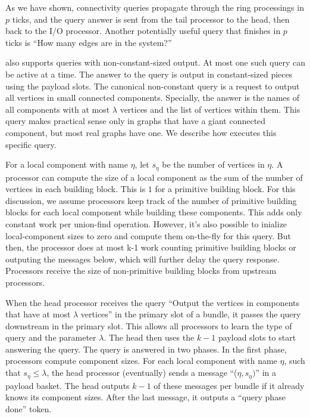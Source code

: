 As we have shown, connectivity queries propagate through the \XStream ring
processings in $p$ \XStream ticks, and the query answer is sent from the
tail processor to the head, then back to the I/O processor. Another potentially
useful query that finishes in $p$ \XStream ticks is ``How many edges are in the system?''
 

\XStream also supports queries with non-constant-sized output. At most
one such query can be active at a time. The answer to the query is
output in constant-sized pieces using the payload slots. The canonical
non-constant query is a request to output all vertices in small
connected components. Specially, the answer is the names of all
components with at most $\lambda$ vertices and the list of vertices
within them.  This query makes practical sense only in graphs that
have a giant connected component, but most real graphs have one. We
describe how \XStream executes this specific query.

For a local component with name $\eta$, let $s_{\eta}$ be the number
of vertices in $\eta$.  A processor can compute the size of a local
component as the sum of the number of vertices in each building block.
This is $1$ for a primitive building block.  For this discussion, we
assume processors keep track of the number of primitive building
blocks for each local component while building these components. This
adds only constant work per union-find operation.  However, it's also
possible to inialize local-component sizes to zero and compute them
on-the-fly for this query.  But then, the processor does at most k-1
work counting primitive building blocks or outputing the messages
below, which will further delay the query response. Processors receive
the size of non-primitive building blocks from upstream processors.

When the head processor receives the query ``Output the vertices in
components that have at most $\lambda$ vertices'' in the primary slot
of a bundle, it passes the query downstream in the primary slot. This
allows all processors to learn the type of query and the parameter
$\lambda$. The head then uses the $k-1$ payload slots to start
answering the query.  The query is answered in two phases.  In the
first phase, processors compute component sizes.  For each local
component with name $\eta$, such that $s_{\eta} \le \lambda$, the head
processor (eventually) sends a message ``($\eta, s_{\eta})$'' in a
payload basket. The head outputs $k-1$ of these messages per bundle if
it already knows its component sizes. After the last message, it
outputs a ``query phase done'' token.

